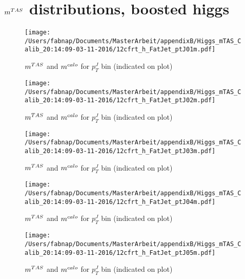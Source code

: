 \clearpage
\onecolumn
\vspace*{\fill}
\section{$m^{TAS}$  distributions, boosted higgs}
\vfill
\clearpage
\twocolumn

\begin{figure}
 
\texttt{[image: /Users/fabnap/Documents/MasterArbeit/appendixB/Higgs\_mTAS\_Calib\_20:14:09-03-11-2016/12cfrt\_h\_FatJet\_ptJ01m.pdf]}
\caption{$m^{TAS}$ and $m^{calo}$ for $p_{T}^{J}$ bin (indicated on plot) }
 
\end{figure}
 
\begin{figure}
 
\texttt{[image: /Users/fabnap/Documents/MasterArbeit/appendixB/Higgs\_mTAS\_Calib\_20:14:09-03-11-2016/12cfrt\_h\_FatJet\_ptJ02m.pdf]}
\caption{$m^{TAS}$ and $m^{calo}$ for $p_{T}^{J}$ bin (indicated on plot) }
 
\end{figure}
 
\begin{figure}
 
\texttt{[image: /Users/fabnap/Documents/MasterArbeit/appendixB/Higgs\_mTAS\_Calib\_20:14:09-03-11-2016/12cfrt\_h\_FatJet\_ptJ03m.pdf]}
\caption{$m^{TAS}$ and $m^{calo}$ for $p_{T}^{J}$ bin (indicated on plot) }
 
\end{figure}
 
\begin{figure}
 
\texttt{[image: /Users/fabnap/Documents/MasterArbeit/appendixB/Higgs\_mTAS\_Calib\_20:14:09-03-11-2016/12cfrt\_h\_FatJet\_ptJ04m.pdf]}
\caption{$m^{TAS}$ and $m^{calo}$ for $p_{T}^{J}$ bin (indicated on plot) }
 
\end{figure}
 
\begin{figure}
 
\texttt{[image: /Users/fabnap/Documents/MasterArbeit/appendixB/Higgs\_mTAS\_Calib\_20:14:09-03-11-2016/12cfrt\_h\_FatJet\_ptJ05m.pdf]}
\caption{$m^{TAS}$ and $m^{calo}$ for $p_{T}^{J}$ bin (indicated on plot) }
 
\end{figure}
 
